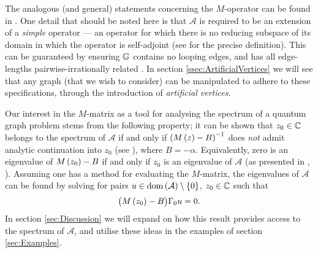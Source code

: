 The analogous (and general) statements concerning the $M$-operator can be found in \cite{derkach1991generalized, derkach2014boundary}.
One detail that should be noted here is that $\mathcal{A}$ is required to be an extension of a \emph{simple} operator --- an operator for which there is no reducing subspace of its domain in which the operator is self-adjoint (see \cite[Section 2.2]{ershova2014isospectrality} for the precise definition).
This can be guaranteed by ensuring $\mathbb{G}$ contains no looping edges, and has all edge-lengths pairwise-irrationally related \cite{ashurova2014simplicity}.
In section \ref{ssec:ArtificialVertices} we will see that any graph (that we wish to consider) can be manipulated to adhere to these specifications, through the introduction of \emph{artificial vertices}.

Our interest in the $M$-matrix as a tool for analysing the spectrum of a quantum graph problem stems from the following property; it can be shown that $z_0\in\mathbb{C}$ belongs to the spectrum of $\mathcal{A}$ if and only if $\left( M\left( z \right) - B \right)^{-1}$ does \emph{not} admit analytic continuation into $z_0$ (see \cite[Theorem 2.1]{ershova2014isospectrality}), where $B=-\alpha$.
Equivalently, zero is an eigenvalue of $M\left( z_0 \right)-B$ if and only if $z_0$ is an eigenvalue of $\mathcal{A}$ (as presented in \cite[Proposition 1]{derkach1991generalized}, \cite[page 698]{cherednichenko2019time}).
Assuming one has a method for evaluating the $M$-matrix, the eigenvalues of $\mathcal{A}$ can be found by solving for pairs $u\in\mathrm{dom}\left( \mathcal{A} \right)\setminus\left\{ 0 \right\}$, $z_0\in\mathbb{C}$ such that
\begin{align*}
	\bigl( M\left( z_0 \right) - B \bigr) \Gamma_0 u = 0.
\end{align*}
In section \ref{sec:Discussion} we will expand on how this result provides access to the spectrum of $\mathcal{A}$, and utilise these ideas in the examples of section \ref{sec:Examples}.

